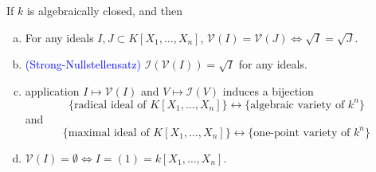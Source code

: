 \begin{colorcorollary}
    If \(k\) is algebraically closed, and then

    \begin{enumerate}[(a)]
    \item  For any ideals \(I,J \subset K[X_1,\dots,X_n]\), \(\mathcal{V}(I) = \mathcal{V}(J) \iff \sqrt{I} = \sqrt{J}\).


    \item \textcolor{blue}{(Strong-Nullstellensatz)}  \(\mathcal{I}(\mathcal{V}(I)) = \sqrt{I}\) for any ideals.
    
    \item application \(I \mapsto \mathcal{V}(I)\) and \(V \mapsto \mathcal{I}(V)\) induces a bijection
    \[\{\text{radical ideal of } K[X_1,\dots,X_n]\} \longleftrightarrow \{\text{algebraic variety of } k^n\}\]
    and
    \[\{\text{maximal ideal of } K[X_1,\dots,X_n]\} \longleftrightarrow \{\text{one-point variety of }  k^n\}\]
    \item \(\mathcal{V}(I) = \emptyset \iff I = (1) = k[X_1,\dots,X_n]\).
    \end{enumerate}

\end{colorcorollary}
